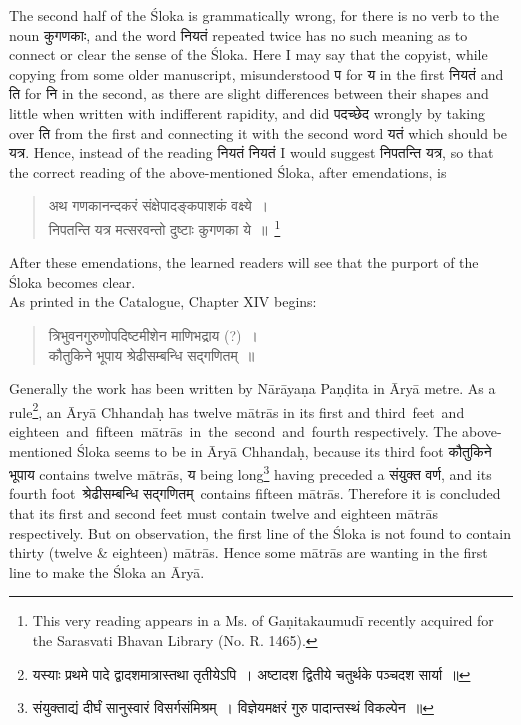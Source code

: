 \documentclass[11pt, openany]{book}
\begin{document}
\newpage%
\fancyhead[C]{(~\thepage~)}
\cfoot{}
\setcounter{page}{2}

 The second half of the Śloka is grammatically wrong, for 
there is no verb to the noun कुगणकाः, and the word नियतं repeated 
twice has no such meaning as to connect or clear the sense 
of the Śloka. Here I may say that the copyist, while copying 
from some older manuscript, misunderstood प for य in the first 
नियतं and ति for नि in the second, as there are slight differences between their shapes and little when written with indifferent rapidity, and did पदच्छेद wrongly by taking over ति from the 
first and connecting it with the second word यतं which should 
be यत्र. Hence, instead of the reading नियतं नियतं I would suggest 
निपतन्ति यत्र, so that the correct reading of the above-mentioned 
Śloka, after emendations, is 
\begin{quote}
\qt
        अथ गणकानन्दकरं संक्षेपादङ्कपाशकं वक्ष्ये~। \\
 निपतन्ति यत्र मत्सरवन्तो दुष्टाः कुगणका ये~॥~\renewcommand{\thefootnote}{\fnsymbol{footnote}}\footnote[2]{This very reading appears in a Ms. of Gaṇitakaumudī recently 
acquired for the Sarasvati Bhavan Library (No. R. 1465). }
\end{quote}
 
 After these emendations, the learned readers will see that 
the purport of the Śloka becomes clear. \\

\vspace{-2mm}
 As printed in the Catalogue, Chapter XIV begins: 
\begin{quote}
    \qt 
     त्रिभुवनगुरुणोपदिष्टमीशेन माणिभद्राय (?)~। \\
 कौतुकिने भूपाय श्रेढीसम्बन्धि सद्गणितम्~॥~
\end{quote}

 Generally the work has been written by Nārāyaṇa
Paṇḍita 
in Āryā metre. As a rule\renewcommand{\thefootnote}{2}\footnote{{\color{violet}यस्याः प्रथमे पादे द्वादशमात्रास्तथा तृतीयेऽपि~। अष्टादश द्वितीये चतुर्थके पञ्चदश सार्या~॥}}, an Āryā Chhandaḥ has twelve
mātrās in its first and third \,feet \,and \,eighteen \,and \,fifteen \,mātrās \,in \,the \,second \,and \,fourth respectively. The above-mentioned Śloka seems to be in Āryā Chhandaḥ, because its 
third foot कौतुकिने भूपाय contains twelve mātrās, य being 
long\renewcommand{\thefootnote}{3}\footnote{{\color{violet}संयुक्ताद्यं दीर्घं सानुस्वारं विसर्गसंमिश्रम्~। विज्ञेयमक्षरं गुरु पादान्तस्थं विकल्पेन~॥}} having preceded a संयुक्त वर्ण, and its fourth foot\textemdash\ 
श्रेढीसम्बन्धि सद्गणितम्\textemdash\ contains fifteen mātrās. Therefore it
is concluded that its first and second feet must contain twelve 
and eighteen mātrās respectively. But on observation, the 
first line of the Śloka is not found to contain thirty (twelve \& 
eighteen) mātrās. Hence some mātrās are wanting in the
first line to make the Śloka an Āryā. \\
\end{document}
